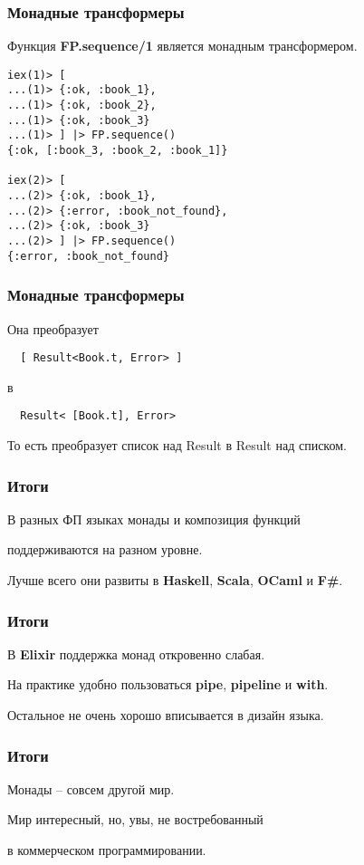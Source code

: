 \documentclass[10pt]{beamer}
\begin{document}
\begin{frame}[fragile]
  \frametitle{Монадные трансформеры}
  Функция \textbf{FP.sequence/1} является монадным трансформером.  
  \par \bigskip
  \begin{lstlisting}
iex(1)> [
...(1)> {:ok, :book_1},
...(1)> {:ok, :book_2},
...(1)> {:ok, :book_3}
...(1)> ] |> FP.sequence()
{:ok, [:book_3, :book_2, :book_1]}

iex(2)> [
...(2)> {:ok, :book_1},
...(2)> {:error, :book_not_found},
...(2)> {:ok, :book_3}
...(2)> ] |> FP.sequence()
{:error, :book_not_found}
  \end{lstlisting}
\end{frame}

\begin{frame}[fragile]
  \frametitle{Монадные трансформеры}
  Она преобразует
  \par \bigskip
  \begin{lstlisting}
  [ Result<Book.t, Error> ]
  \end{lstlisting}
  в
  \begin{lstlisting}
  Result< [Book.t], Error>
  \end{lstlisting}
  \par \bigskip
  То есть преобразует список над Result в Result над списком.
\end{frame}

\begin{frame}
  \frametitle{Итоги}
  В разных ФП языках монады и композиция функций
  \par \bigskip
  поддерживаются на разном уровне.
  \par \bigskip
  Лучше всего они развиты в \textbf{Haskell}, \textbf{Scala}, \textbf{OCaml} и \textbf{F\#}.
\end{frame}

\begin{frame}
  \frametitle{Итоги}
  В \textbf{Elixir} поддержка монад откровенно слабая.
  \par \bigskip
  На практике удобно пользоваться \textbf{pipe}, \textbf{pipeline} и \textbf{with}.
  \par \bigskip
  Остальное не очень хорошо вписывается в дизайн языка.
\end{frame}

\begin{frame}
  \frametitle{Итоги}
  Монады -- совсем другой мир.
  \par \bigskip
  Мир интересный, но, увы, не востребованный
  \par \bigskip
  в коммерческом программировании.
\end{frame}
\end{document}
